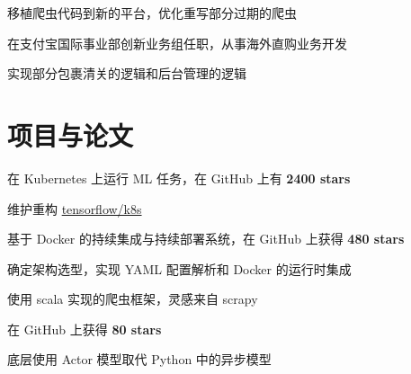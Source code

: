 \documentclass[]{deedy-resume-openfont}
\begin{document}
\begin{minipage}[t]{0.68\textwidth}
\begin{tightemize}
\item 移植爬虫代码到新的平台，优化重写部分过期的爬虫
\end{tightemize}
\sectionsep

\begin{tightemize}
\item 在支付宝国际事业部创新业务组任职，从事海外直购业务开发
\item 实现部分包裹清关的逻辑和后台管理的逻辑
\end{tightemize}
\sectionsep


\section{项目与论文}
\sectionsep

\begin{tightemize}
    \item 在 Kubernetes 上运行 ML 任务，在 GitHub 上有 \textbf{2400 stars}
    \item 维护重构 \href{https://github.com/tensorflow/k8s}{tensorflow/k8s}
    \end{tightemize}
\sectionsep

\begin{tightemize}
    \item 基于 Docker 的持续集成与持续部署系统，在 GitHub 上获得 \textbf{480 stars}
    \item 确定架构选型，实现 YAML 配置解析和 Docker 的运行时集成
    \end{tightemize}
\sectionsep

\begin{tightemize}
    \item 使用 scala 实现的爬虫框架，灵感来自 scrapy
    \item 在 GitHub 上获得 \textbf{80 stars}
    \item 底层使用 Actor 模型取代 Python 中的异步模型
    \end{tightemize}
\sectionsep


\end{minipage}
\end{document}
